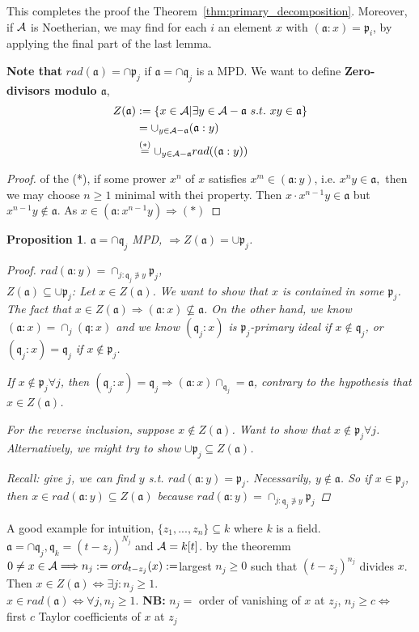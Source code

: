 \documentclass[11pt]{article}
\newtheorem{prop}[thm]{Proposition}
\newcommand{\sca}{{\mathfrak a}}
\newcommand{\scp}{{\mathfrak p}}
\newcommand{\scq}{\mathfrak q}
\newcommand{\cala}{{\cal A}}
\newcommand{\Lrta}{\Longrightarrow}
\newcommand{\Llrta}{\Longleftrightarrow}
\begin{document}
This completes the proof the Theorem~\ref{thm:primary_decomposition}. Moreover, if $\cala$ is Noetherian, we may find for each $i$ an element $x$ with $(\sca:x)=\scp_i$, by applying the final part of the last lemma.


\textbf{Note that} $rad(\sca)=\cap\scp_j$ if $\sca=\cap\scq_j$ is a  MPD.
We want to define 
\textbf{Zero-divisors modulo $\sca$}, 
$$
\begin{aligned}
Z(\sca)&:=\{x\in\cala|\exists y\in\cala-\sca\ s.t.\ xy\in\sca\}\\
&=\cup_{y\in\cala-\sca}(\sca:y)\\
&\overset{(*)}{=}\cup_{y\in\cala-\sca}rad((\sca:y))
\end{aligned}
$$
\begin{proof} of the (*), if some prower $x^n$ of $x$ satisfies $x^m\in(\sca:y)$, i.e. $x^n y\in\sca,$ then we may choose $n\geq 1$ minimal with thei property. Then $x\cdot x^{n-1}y\in \sca$ but $x^{n-1}y \notin \sca$. As $x\in(\sca:x^{n-1}y)\Lrta (*)$
\end{proof}

\begin{prop}
$\sca=\cap\scq_j$ MPD,
$\Lrta Z(\sca)=\cup\scp_j$.
\begin{proof}
$rad(\sca:y)=\cap_{j:\scq_j\not \ni y}\scp_j$,\\ $Z(\sca)\subseteq \cup\scp_j$: Let $x\in Z(\sca)$. We want to show that $x$ is contained in some $\scp_j$. The fact that $x\in Z(\sca)\Lrta(\sca:x)\not \subseteq \sca$. On the other hand, we know $(\sca:x)=\cap_j(\scq:x)$ and we know $(\scq_j:x)$ is $\scp_j$-primary ideal if $x\notin\scq_j$, or $(\scq_j:x)=\scq_j$ if $x\notin\scp_j$.

If $x\notin\scp_j\forall j$, then $(\scq_j:x)=\scq_j\Lrta (\sca:x)\cap_{\scq_j}=\sca$, contrary to the hypothesis that $x\in Z(\sca)$.

For the reverse inclusion, suppose $x\notin Z(\sca)$. Want to show that $x\notin\scp_j\forall j$. Alternatively, we might try to show  $\cup\scp_j\subseteq Z(\sca)$.

Recall: give $j$, we can find $y$ s.t. $rad(\sca:y)=\scp_j$. Necessarily, $y\notin\sca$. So if $x\in \scp_j$, then $x\in  rad(\sca:y)\subseteq Z(\sca)$ because $rad(\sca:y)=\cap_{j:\scq_j\not\ni y}\scp_j$ 
\end{proof}
\end{prop}


A good example for intuition, $\{z_1,...,z_n\}\subseteq k$ where $k$ is a field. $\sca=\cap \scq_j, \scq_k=(t-z_j)^{N_j}$ and $\cala=k[t]$.
by the theoremm $0\neq x\in\cala\Lrta n_j:=ord_{t-z_j}(x):=$largest $n_j\geq 0$ such that $(t-z_j)^{n_j}$ divides $x$.\\
Then $x\in Z(\sca)\Llrta \exists j:n_j\geq 1$.\\
$x\in rad(\sca)\Llrta \forall j, n_j\geq1$.
\textbf{NB:} $n_j=$ order of vanishing of $x $ at $z_j$, $n_j\geq c\Llrta $ first $c$ Taylor coefficients of $x$ at $z_j$
\end{document}
